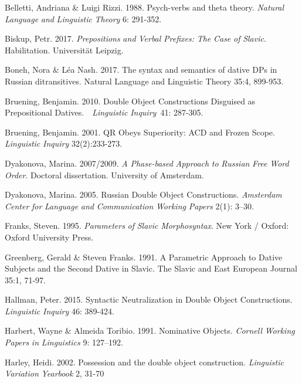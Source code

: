 \documentclass[output=paper,modfonts, nonflat]{langsci/langscibook}
\begin{document}
\begin{styleNormalWeb}
Belletti, Andriana \& Luigi Rizzi. 1988. Psych-verbs and theta theory. \textit{Natural} \textit{Language} \textit{and} \textit{Linguistic} \textit{Theory} 6: 291-352. 
\end{styleNormalWeb}

\begin{styleNormalWeb}
Biskup, Petr. 2017. \textit{Prepositions} \textit{and} \textit{Verbal} \textit{Prefixes:} \textit{The} \textit{Case} \textit{of} \textit{Slavic}. Habilitation. Universität Leipzig.
\end{styleNormalWeb}

\begin{styleNormalWeb}
Boneh, Nora \& Léa Nash. 2017. The syntax and semantics of dative DPs in Russian ditransitives. Natural Language and Linguistic Theory 35:4, 899-953.
\end{styleNormalWeb}

Bruening, Benjamin. 2010. Double Object Constructions Disguised as Prepositional Datives.~~\textit{Linguistic} \textit{Inquiry}~41: 287-305.

Bruening, Benjamin. 2001. QR Obeys Superiority: ACD and Frozen Scope. \textit{Linguistic} \textit{Inquiry}  32(2):233-273.

Dyakonova, Marina. 2007/2009. \textit{A} \textit{Phase-based} \textit{Approach} \textit{to} \textit{Russian} \textit{Free} \textit{Word} \textit{Order}. Doctoral dissertation. University of Amsterdam. 

Dyakonova, Marina. 2005. Russian Double Object Constructions. \textit{Amsterdam} \textit{Center} \textit{for} \textit{Language} \textit{and} \textit{Communication} \textit{Working} \textit{Papers} 2(1): 3–30. 

Franks, Steven. 1995. \textit{Parameters} \textit{of} \textit{Slavic} \textit{Morphosyntax}. New York / Oxford: Oxford University Press.

Greenberg, Gerald \& Steven Franks. 1991. A Parametric Approach to Dative Subjects and the Second Dative in Slavic. The Slavic and East European Journal 35:1, 71-97.

Hallman, Peter. 2015. Syntactic Neutralization in Double Object Constructions. \textit{Linguistic} \textit{Inquiry} 46: 389-424.

Harbert, Wayne \& Almeida Toribio. 1991. Nominative Objects. \textit{Cornell} \textit{Working} \textit{Papers} \textit{in} \textit{Linguistics} 9: 127–192. 

Harley, Heidi. 2002. Possession and the double object construction. \textit{Linguistic} \textit{Variation} \textit{Yearbook} 2, 31-70
\end{document}
